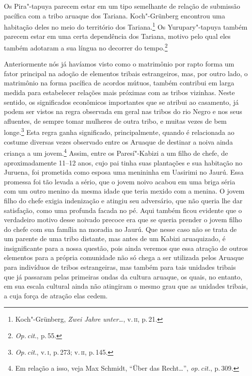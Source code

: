 Os Pira"-tapuya parecem estar em um tipo semelhante de relação de
submissão pacífica com a tribo aruaque dos Tariana. Koch"-Grünberg
encontrou uma habitação deles no meio do território dos
Tariana.\footnote{Koch"-Grünberg, \textit{Zwei Jahre unter\ldots},
  v.\,\textsc{ii}, p.\,21.} Os Yurupary"-tapuya também parecem estar em uma certa
dependência dos Tariana, motivo pelo qual eles também adotaram a sua
língua no decorrer do tempo.\footnote{\textit{Op.\,cit}., p.\,55.}

Anteriormente nós já havíamos visto como o matrimônio por rapto forma um
fator principal na adoção de elementos tribais estrangeiros, mas, por
outro lado, o matrimônio na forma pacífica de acordos mútuos, também
contribui em larga medida para estabelecer relações mais próximas com as
tribos vizinhas. Neste sentido, os significados econômicos importantes
que se atribui ao casamento, já podem ser vistos na regra observada em
geral nas tribos do rio Negro e nos seus afluentes, de sempre tomar
mulheres de outra tribo, e muitas vezes de bem longe.\footnote{\textit{Op.\,cit}.,
  v.\,\textsc{i}, p.\,273; v.\,\textsc{ii}, p.\,145.} Esta regra ganha significado,
principalmente, quando é relacionada ao costume diversas vezes observado
entre os Aruaque de destinar a noiva ainda criança a um jovem.\footnote{Em
  relação a isso, veja Max Schmidt, ``Über das Recht\ldots'', \textit{op.\,cit.}, p.\,309.} Assim, entre os
Paresí"-Kabizi a um filho de chefe, de aproximadamente 11--12 anos, cujo
pai tinha suas plantações e sua habitação no Juruena, foi prometida
como esposa uma menininha em Uasirimi no Jaurú. Essa promessa foi tão
levada a sério, que o jovem noivo acabou em uma briga séria com um outro
menino da mesma idade que teria mexido com a menina. O jovem filho do
chefe exigia indenização e atingiu seu adversário, que não queria lhe
dar satisfação, como uma profunda facada no pé. Aqui também ficou
evidente que o verdadeiro motivo desse noivado precoce era que se queria
prender o jovem filho do chefe com sua família na moradia no Jaurú. Que
nesse caso não se trata de um parente de uma tribo distante, mas antes
de um Kabizi aruaquizado, é insignificante para a nossa questão, pois
ainda veremos que essa atração de outros elementos para a própria
comunidade não só chega a ser utilizada pelos Aruaque para indivíduos de
tribos estrangeiras, mas também para tais unidades tribais que já
passaram pelas primeiras ondas da cultura aruaque, os quais, no
entanto, em sua escala cultural ainda não atingiram o mesmo grau que as
unidades tribais, a cuja força de atração elas cedem.

